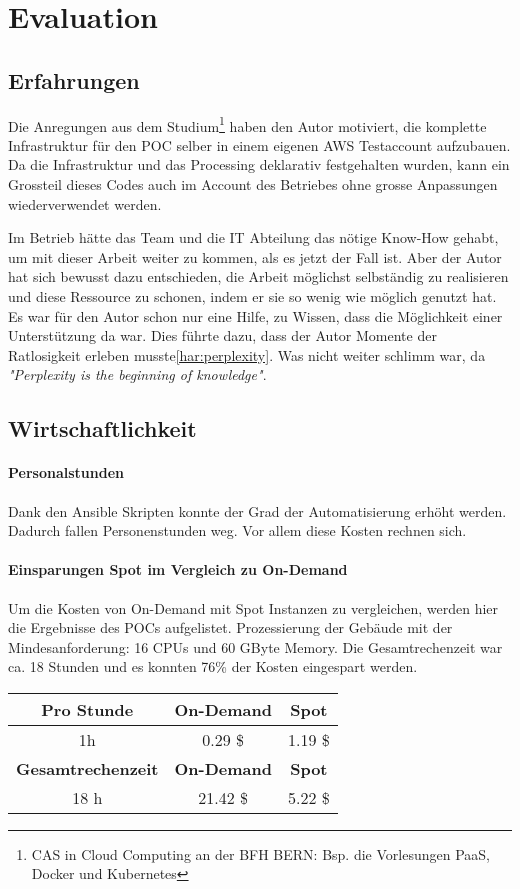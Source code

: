 \section{Evaluation}
\subsection{Erfahrungen}
Die Anregungen aus dem Studium\footnote{CAS in Cloud Computing an der BFH BERN: Bsp. die Vorlesungen PaaS, Docker und Kubernetes} haben den Autor motiviert, die komplette Infrastruktur für den POC selber in einem eigenen AWS Testaccount aufzubauen. Da die Infrastruktur und das Processing deklarativ festgehalten wurden, kann ein Grossteil dieses Codes auch im Account des Betriebes ohne grosse Anpassungen wiederverwendet werden.

Im Betrieb hätte das Team und die IT Abteilung das nötige Know-How gehabt, um mit dieser Arbeit weiter zu kommen, als es jetzt der Fall ist. Aber der Autor hat sich bewusst dazu entschieden, die Arbeit möglichst selbständig zu realisieren und  diese Ressource zu schonen, indem er sie so wenig wie möglich genutzt hat. Es war für den Autor schon nur eine Hilfe, zu Wissen, dass die Möglichkeit einer Unterstützung da war. Dies führte dazu, dass der Autor Momente der Ratlosigkeit erleben musste\ref{har:perplexity}. Was nicht weiter schlimm war, da \textit{"Perplexity is the beginning of knowledge"}\autocite[33]{CloudNativ:1}.

\subsection{Wirtschaftlichkeit}
\paragraph{Personalstunden}
Dank den Ansible Skripten konnte der Grad der Automatisierung erhöht werden. Dadurch fallen Personenstunden weg. Vor allem diese Kosten rechnen sich.
\paragraph{Einsparungen Spot im Vergleich zu On-Demand}
Um die Kosten von On-Demand mit Spot Instanzen zu vergleichen, werden hier die Ergebnisse des POCs aufgelistet. Prozessierung der Gebäude mit der Mindesanforderung: 16 CPUs und 60 GByte Memory. Die Gesamtrechenzeit war ca. 18 Stunden und es konnten 76\% der Kosten eingespart werden.

\begin{center}
\begin{tabular}{| c | c | c |}
    \hline
	\textbf{Pro Stunde} & \textbf{On-Demand} & \textbf{Spot}\\
	\hline
	 1h & 0.29 \$ & 1.19 \$\\
	\hline
	\textbf{Gesamtrechenzeit} & \textbf{On-Demand} & \textbf{Spot}\\
	\hline
	 18 h & 21.42 \$ & 5.22 \$\\
	\hline
\end{tabular}
\end{center}

